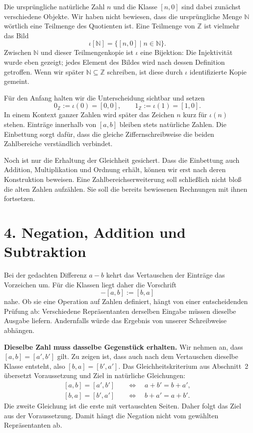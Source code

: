 Die ursprüngliche natürliche Zahl \(n\) und die Klasse \([n,0]\)
sind dabei zunächst verschiedene Objekte. Wir haben nicht bewiesen,
dass die ursprüngliche Menge \(\mathbb N\) wörtlich eine Teilmenge
des Quotienten ist. Eine Teilmenge von \(\mathbb Z\) ist vielmehr
das Bild
\[
  \iota[\mathbb N]=\{[n,0]\mid n\in\mathbb N\}.
\]
Zwischen \(\mathbb N\) und dieser Teilmengenkopie ist \(\iota\)
eine Bijektion: Die Injektivität wurde eben gezeigt; jedes Element
des Bildes wird nach dessen Definition getroffen. Wenn wir später
\(\mathbb N\subseteq\mathbb Z\) schreiben, ist diese durch
\(\iota\) identifizierte Kopie gemeint.

Für den Anfang halten wir die Unterscheidung sichtbar und setzen
\[
  0_{\mathbb Z}:=\iota(0)=[0,0],
  \qquad
  1_{\mathbb Z}:=\iota(1)=[1,0].
\]
In einem Kontext ganzer Zahlen wird später das Zeichen \(n\) kurz
für \(\iota(n)\) stehen. Einträge innerhalb von \([a,b]\) bleiben
stets natürliche Zahlen. Die Einbettung sorgt dafür, dass die gleiche
Ziffernschreibweise die beiden Zahlbereiche verständlich verbindet.

Noch ist nur die Erhaltung der Gleichheit gesichert. Dass die
Einbettung auch Addition, Multiplikation und Ordnung erhält, können
wir erst nach deren Konstruktion beweisen. Eine Zahlbereichserweiterung
soll schließlich nicht bloß die alten Zahlen aufzählen. Sie soll die
bereits bewiesenen Rechnungen mit ihnen fortsetzen.

\par{}
\hypertarget{integers.reading.addition}{}
\section*{4. Negation, Addition und Subtraktion}

Bei der gedachten Differenz \(a-b\) kehrt das Vertauschen der
Einträge das Vorzeichen um. Für die Klassen liegt daher die Vorschrift
\[
  -[a,b]:=[b,a]
\]
nahe. Ob sie eine Operation auf Zahlen definiert, hängt von einer
entscheidenden Prüfung ab: Verschiedene Repräsentanten derselben
Eingabe müssen dieselbe Ausgabe liefern. Andernfalls würde das
Ergebnis von unserer Schreibweise abhängen.

\medskip\noindent\textbf{Dieselbe Zahl muss dasselbe Gegenstück erhalten.}
Wir nehmen an, dass \([a,b]=[a',b']\) gilt. Zu zeigen ist, dass
auch nach dem Vertauschen dieselbe Klasse entsteht, also
\([b,a]=[b',a']\). Das Gleichheitskriterium aus Abschnitt~2
übersetzt Voraussetzung und Ziel in natürliche Gleichungen:
\[
  \begin{aligned}
    [a,b]=[a',b']&\quad\Longleftrightarrow\quad a+b'=b+a',\\
    [b,a]=[b',a']&\quad\Longleftrightarrow\quad b+a'=a+b'.
  \end{aligned}
\]
Die zweite Gleichung ist die erste mit vertauschten Seiten. Daher
folgt das Ziel aus der Voraussetzung. Damit hängt die Negation
nicht vom gewählten Repräsentanten ab.

